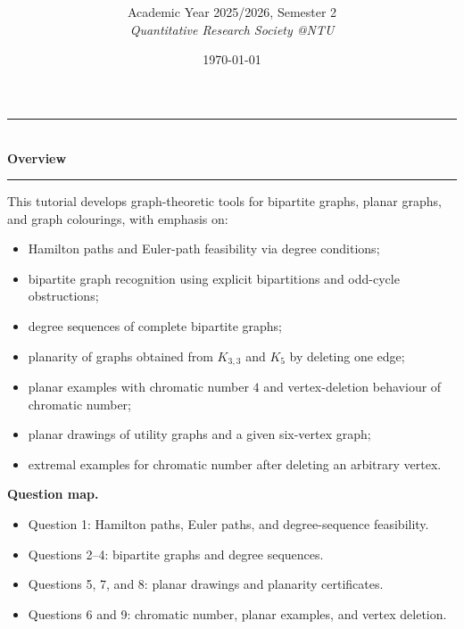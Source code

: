 \documentclass[12pt]{article}
\title{
\CourseCode\ \CourseName \\[0.3em]
\large \DocType
}
\author{
  Academic Year 2025/2026, Semester 2 \\[0.25em]
  \textit{Quantitative Research Society @NTU}
}
\date{\today}
\begin{document}
\maketitle
\thispagestyle{plainfirst}
\pagestyle{main}

\begin{center}
  \rule{0.82\textwidth}{0.4pt}\\[4pt]
  \textbf{Overview}\\[2pt]
  \rule{0.82\textwidth}{0.4pt}
\end{center}

\noindent
This tutorial develops graph-theoretic tools for bipartite graphs, planar graphs, and graph colourings, with emphasis on:
\begin{itemize}[leftmargin=*]
  \item Hamilton paths and Euler-path feasibility via degree conditions;
  \item bipartite graph recognition using explicit bipartitions and odd-cycle obstructions;
  \item degree sequences of complete bipartite graphs;
  \item planarity of graphs obtained from $K_{3,3}$ and $K_5$ by deleting one edge;
  \item planar examples with chromatic number $4$ and vertex-deletion behaviour of chromatic number;
  \item planar drawings of utility graphs and a given six-vertex graph;
  \item extremal examples for chromatic number after deleting an arbitrary vertex.
\end{itemize}

\noindent
\textbf{Question map.}
\begin{itemize}[leftmargin=*]
  \item Question 1: Hamilton paths, Euler paths, and degree-sequence feasibility.
  \item Questions 2--4: bipartite graphs and degree sequences.
  \item Questions 5, 7, and 8: planar drawings and planarity certificates.
  \item Questions 6 and 9: chromatic number, planar examples, and vertex deletion.
\end{itemize}

\newpage
\tableofcontents
\newpage
\end{document}
